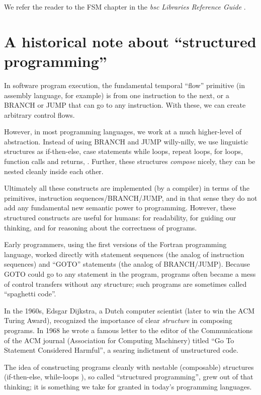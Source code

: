 We refer the reader to the FSM chapter in the \emph{bsc Libraries
Reference Guide} \cite{bsc_libs_ref_guide}.


\section{A historical note about ``structured programming''}

In software program execution, the fundamental temporal ``flow''
primitive (in assembly language, for example) is from one instruction
to the next, or a BRANCH or JUMP that can go to any instruction.  With
these, we can create arbitrary control flows.

However, in most programming languages, we work at a much higher-level
of abstraction.  Instead of using BRANCH and JUMP willy-nilly, we use
linguistic structures as if-then-else, case statements while loops,
repeat loops, for loops, function calls and returns, {\etc}.  Further,
these structures \emph{compose} nicely, {\ie} they can be nested
cleanly inside each other.

Ultimately all these constructs are implemented (by a compiler) in
terms of the primitives, instruction sequences/BRANCH/JUMP, and in
that sense they do not add any fundamental new semantic power to
programming.  However, these structured constructs are useful for
humans: for readability, for guiding our thinking, and for reasoning
about the correctness of programs.

Early programmers, {\eg} using the first versions of the Fortran
programming language, worked directly with statement sequences (the
analog of instruction sequences) and ``GOTO'' statements (the analog
of BRANCH/JUMP).  Because GOTO could go to any statement in the
program, programs often became a mess of control transfers without any
structure; such programs are sometimes called ``spaghetti code''.

In the 1960s, Edsgar Dijkstra, a Dutch computer scientist (later to
win the ACM Turing Award), recognized the importance of clear
\emph{structure} in composing programs.  In 1968 he wrote a famous
letter to the editor of the Communications of the ACM journal
(Association for Computing Machinery) titled ``Go To Statement
Considered Harmful'', a searing indictment of unstructured code.

The idea of constructing programs cleanly with nestable (composable)
structures (if-then-else, while-loops {\etc}), so called ``structured
programming'', grew out of that thinking; it is something we take for
granted in today's programming languages.

